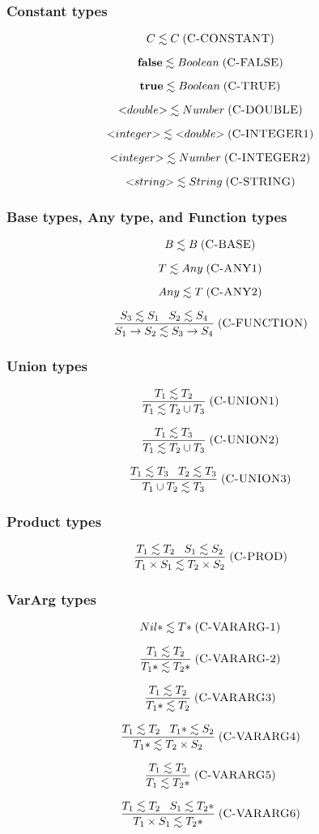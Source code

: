 \documentclass{beamer}
\newcommand{\mylabel}[1]{\; (\textsc{#1})}
\begin{document}
\begin{frame}
\frametitle{Constant types}
\[
C \lesssim C
\mylabel{C-CONSTANT}
\]

\[
\mathbf{false} \lesssim Boolean
\mylabel{C-FALSE}
\]

\[
\mathbf{true} \lesssim Boolean
\mylabel{C-TRUE}
\]

\[
{<}double{>} \lesssim Number
\mylabel{C-DOUBLE}
\]

\[
{<}integer{>} \lesssim {<}double{>}
\mylabel{C-INTEGER1}
\]

\[
{<}integer{>} \lesssim Number
\mylabel{C-INTEGER2}
\]

\[
{<}string{>} \lesssim String
\mylabel{C-STRING}
\]
\end{frame}

\begin{frame}
\frametitle{Base types, Any type, and Function types}
\[
B \lesssim B
\mylabel{C-BASE}
\]

\[
T \lesssim Any
\mylabel{C-ANY1}
\]

\[
Any \lesssim T
\mylabel{C-ANY2}
\]

\[
\frac{S_{3} \lesssim S_{1} \;\;\; S_{2} \lesssim S_{4}}
     {S_{1} \rightarrow S_{2} \lesssim S_{3} \rightarrow S_{4}}
\mylabel{C-FUNCTION}
\]
\end{frame}

\begin{frame}
\frametitle{Union types}
\[
\frac{T_{1} \lesssim T_{2}}
     {T_{1} \lesssim T_{2} \cup T_{3}}
\mylabel{C-UNION1}
\]

\[
\frac{T_{1} \lesssim T_{3}}
     {T_{1} \lesssim T_{2} \cup T_{3}}
\mylabel{C-UNION2}
\]

\[
\frac{T_{1} \lesssim T_{3} \;\;\; T_{2} \lesssim T_{3}}
     {T_{1} \cup T_{2} \lesssim T_{3}}
\mylabel{C-UNION3}
\]
\end{frame}

\begin{frame}
\frametitle{Product types}
\[
\frac{T_{1} \lesssim T_{2} \;\;\; S_{1} \lesssim S_{2}}
     {T_{1} \times S_{1} \lesssim T_{2} \times S_{2}}
\mylabel{C-PROD}
\]
\end{frame}

\begin{frame}
\frametitle{VarArg types}
\[
{Nil*} \lesssim {T*}
\mylabel{C-VARARG-1}
\]

\[
\frac{T_{1} \lesssim T_{2}}
     {{T_{1}*} \lesssim {T_{2}*}}
\mylabel{C-VARARG-2}
\]

\[
\frac{T_{1} \lesssim T_{2}}
     {{T_{1}*} \lesssim T_{2}}
\mylabel{C-VARARG3}
\]

\[
\frac{T_{1} \lesssim T_{2} \;\;\;
      {T_{1}*} \lesssim S_{2}}
     {{T_{1}*} \lesssim T_{2} \times S_{2}}
\mylabel{C-VARARG4}
\]

\[
\frac{T_{1} \lesssim T_{2}}
     {T_{1} \lesssim {T_{2}*}}
\mylabel{C-VARARG5}
\]

\[
\frac{T_{1} \lesssim T_{2} \;\;\;
      S_{1} \lesssim {T_{2}*}}
     {T_{1} \times S_{1} \lesssim {T_{2}*}}
\mylabel{C-VARARG6}
\]
\end{frame}
\end{document}
